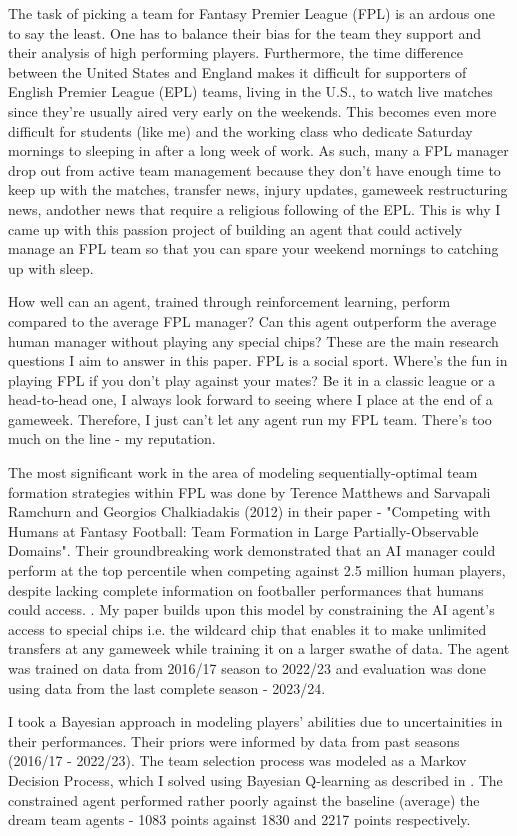 The task of picking a team for Fantasy Premier League (FPL) is an ardous one to say the least. One has to balance their bias for 
the team they support and their analysis of high performing players. Furthermore, the time difference between the United States and England makes 
it difficult for supporters of English Premier League (EPL) teams, living in the U.S., to watch live matches since they're usually aired very early on the weekends. This becomes 
even more difficult for students (like me) and the working class who dedicate Saturday mornings to sleeping in after a long week of work. As such, many a FPL manager 
drop out from active team management because they don't have enough time to keep up with the matches, transfer news, injury updates, gameweek restructuring news, andother news that require a religious following of the EPL. This is why I came up with this passion project of building an agent that could actively manage an FPL team so that you can spare your weekend mornings to catching up with sleep.

How well can an agent, trained through reinforcement learning, perform compared to the average FPL manager? Can this agent outperform the average human manager without playing any special chips? These are the main research questions I aim to answer in this paper. FPL is a social sport. Where's the fun in playing FPL if you don't play against your mates? 
Be it in a classic league or a head-to-head one, I always look forward to seeing where I place at the end of a gameweek. Therefore, I just can't let any agent run my FPL team. There's too much on the line - my reputation.

The most significant work in the area of modeling sequentially-optimal team formation strategies within FPL was done by Terence Matthews and Sarvapali Ramchurn and Georgios Chalkiadakis (2012) in their paper - "Competing with Humans at Fantasy Football: Team Formation in Large Partially-Observable Domains". Their groundbreaking work demonstrated that an AI manager could perform at the top percentile when competing against 2.5 million human players, despite lacking complete information on footballer performances that humans could access. \cite{matthews2012}. My paper builds upon this model by constraining the AI agent's access to special chips i.e. the wildcard chip that enables it to make unlimited transfers at any gameweek while training it on a larger swathe of data. The agent was trained on data from 2016/17 season to 2022/23 and evaluation was done using data from the last complete season - 2023/24.

I took a Bayesian approach in modeling players' abilities due to uncertainities in their performances. Their priors were informed by data from past seasons (2016/17 - 2022/23). The team selection process was modeled as a Markov Decision Process, which I solved using Bayesian Q-learning as described in \cite{matthews2012}. The constrained agent performed rather poorly against the baseline (average) the dream team agents - 1083 points against 1830 and 2217 points respectively.
